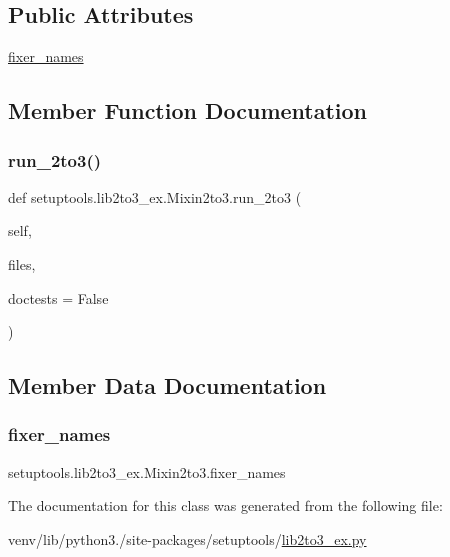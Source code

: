 \subsection*{Public Attributes}
\begin{DoxyCompactItemize}
\item 
\hyperlink{classsetuptools_1_1lib2to3__ex_1_1Mixin2to3_a09fadc61ca6a8492f7bad8914da2f60c}{fixer\+\_\+names}
\end{DoxyCompactItemize}


\subsection{Member Function Documentation}
\mbox{\label{classsetuptools_1_1lib2to3__ex_1_1Mixin2to3_aae906a32ac6d5e790cc30d9505995f11}} 
\subsubsection{\texorpdfstring{run\+\_\+2to3()}{run\_2to3()}}
{\footnotesize\ttfamily def setuptools.\+lib2to3\+\_\+ex.\+Mixin2to3.\+run\+\_\+2to3 (\begin{DoxyParamCaption}\item[{}]{self,  }\item[{}]{files,  }\item[{}]{doctests = {\ttfamily False} }\end{DoxyParamCaption})}



\subsection{Member Data Documentation}
\mbox{\label{classsetuptools_1_1lib2to3__ex_1_1Mixin2to3_a09fadc61ca6a8492f7bad8914da2f60c}} 
\subsubsection{\texorpdfstring{fixer\+\_\+names}{fixer\_names}}
{\footnotesize\ttfamily setuptools.\+lib2to3\+\_\+ex.\+Mixin2to3.\+fixer\+\_\+names}



The documentation for this class was generated from the following file\+:\begin{DoxyCompactItemize}
\item 
venv/lib/python3./site-\/packages/setuptools/\hyperlink{lib2to3__ex_8py}{lib2to3\+\_\+ex.\+py}\end{DoxyCompactItemize}

